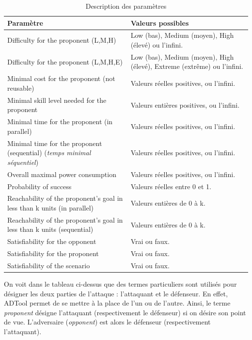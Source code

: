 \begin{table}[!h]
	\centering
	\begin{tabular}{|p{6cm}|p{5cm}|}
  \hline
  \textbf{Paramètre} & \textbf{Valeurs possibles} \\
  \hline
  Difficulty for the proponent (L,M,H) & 
 Low (bas), Medium (moyen), High (élevé) ou l'infini.
\\ \hline
Difficulty for the proponent (L,M,H,E) & 
Low (bas), Medium (moyen), High (élevé), Extreme (extrême) ou l'infini.
\\ \hline
Minimal cost for the proponent (not reusable) & 
Valeurs réelles positives, ou l'infini.\\ \hline
  Minimal skill level needed for the proponent
  & Valeurs entières positives, ou l'infini.\\ \hline
  Minimal time for the proponent (in parallel)
  & Valeurs réelles positives, ou l'infini.\\ \hline
  Minimal time for the proponent (sequential) (\textit{temps minimal séquentiel})
  & Valeurs réelles positives, ou l'infini.\\ \hline
  Overall maximal power consumption & 
  Valeurs réelles positives, ou l'infini.\\ \hline
  Probability of success &
  Valeurs réelles entre 0 et 1.\\ \hline
  Reachability of the proponent's goal in less than k units (in parallel)
  & Valeurs entières de 0 à k. \\ \hline
  Reachability of the proponent's goal in less than k units (sequential)
  & Valeurs entières de 0 à k. \\ \hline
  Satisfiability for the opponent
  & Vrai ou faux. \\ \hline
  Satisfiability for the proponent
  & Vrai ou faux. \\ \hline
  Satisfiability of the scenario
  & Vrai ou faux. \\
  \hline
\end{tabular}
	\caption{Description des paramètres}
	\label{tab:DescriptionParam}
\end{table}

On voit dans le tableau ci-dessus que des termes particuliers sont utilisés pour désigner les deux parties de l'attaque : l'attaquant et le défenseur. En effet, ADTool permet de se mettre à la place de l'un ou de l'autre. Ainsi, le terme \textit{proponent} désigne l'attaquant (respectivement le défenseur) si on désire son point de vue. L'adversaire (\textit{opponent}) est alors le défenseur (respectivement l'attaquant). %


